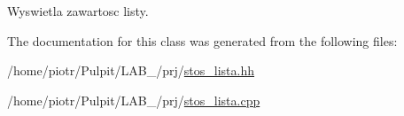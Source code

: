 \-Wyswietla zawartosc listy. 



\-The documentation for this class was generated from the following files\-:\begin{DoxyCompactItemize}
\item 
/home/piotr/\-Pulpit/\-L\-A\-B\-\_/prj/\hyperlink{stos__lista_8hh}{stos\-\_\-lista.\-hh}\item 
/home/piotr/\-Pulpit/\-L\-A\-B\-\_/prj/\hyperlink{stos__lista_8cpp}{stos\-\_\-lista.\-cpp}\end{DoxyCompactItemize}
